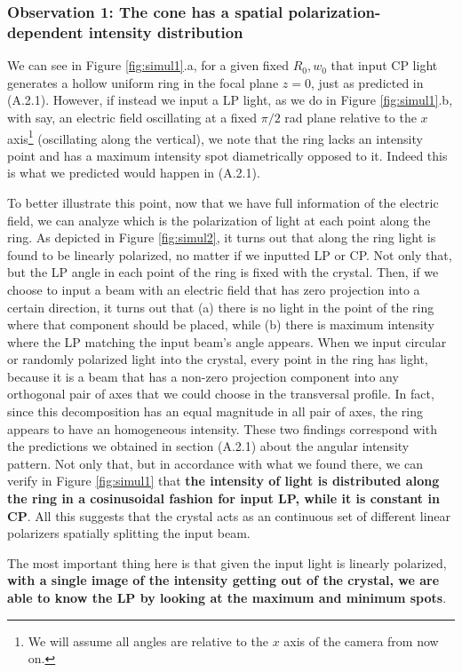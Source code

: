 \documentclass[11pt, a4paper, twoside]{article} %
\begin{document}
\subsubsection*{Observation 1: The cone has a spatial polarization-dependent intensity distribution}
We can see in Figure \ref{fig:simul1}.a, for a given fixed $R_0,w_0$ that input CP light generates a hollow uniform ring in the focal plane $z=0$, just as predicted in (A.2.1). However, if instead we input a LP light, as we do in Figure \ref{fig:simul1}.b, with say, an electric field oscillating at a fixed $\pi/2$ rad plane relative to the $x$ axis\footnote{We will assume all angles are relative to the $x$ axis of the camera from now on.} (oscillating along the vertical), we note that the ring lacks an intensity point and has a maximum intensity spot diametrically opposed to it. Indeed this is what we predicted would happen in (A.2.1). 

To better illustrate this point, now that we have full information of the electric field, we can analyze which is the polarization of light at each point along the ring. As depicted in Figure \ref{fig:simul2}, it turns out that along the ring light is found to be linearly polarized, no matter if we inputted LP or CP. Not only that, but the LP angle in each point of the ring is fixed with the crystal. Then, if we choose to input a beam with an electric field that has zero projection into a certain direction, it turns out that (a) there is no light in the point of the ring where that component should be placed, while (b) there is maximum intensity where the LP matching the input beam's angle appears. When we input circular or randomly polarized light into the crystal, every point in the ring has light, because it is a beam that has a non-zero projection component into any orthogonal pair of axes that we could choose in the transversal profile. In fact, since this decomposition has an equal magnitude in all pair of axes, the ring appears to have an homogeneous intensity. These two findings correspond with the predictions we obtained in section (A.2.1) about the angular intensity pattern. Not only that, but in accordance with what we found there, we can verify in Figure \ref{fig:simul1} that {\bf the intensity of light is distributed along the ring in a cosinusoidal fashion for input LP, while it is constant in CP}. All this suggests that the crystal acts as an continuous set of different linear polarizers spatially splitting the input beam.

The most important thing here is that given the input light is linearly polarized, {\bf with a single image of the intensity getting out of the crystal, we are able to know the LP by looking at the maximum and minimum spots}.
\end{document}
